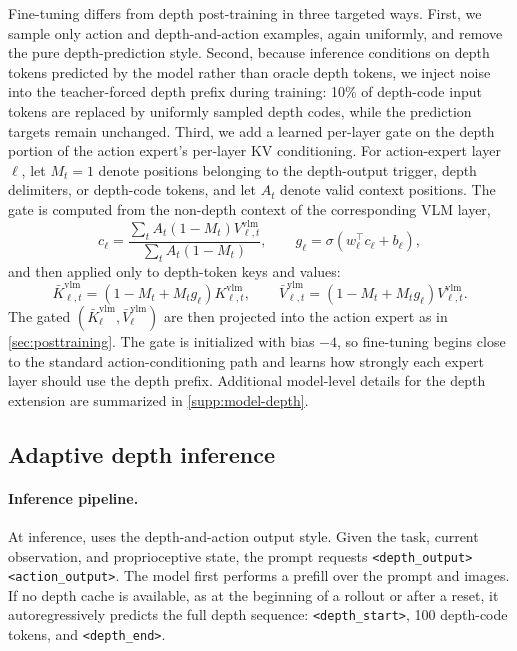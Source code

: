 Fine-tuning differs from depth post-training in three targeted ways. First, we
sample only action and depth-and-action examples, again uniformly, and remove
the pure depth-prediction style. Second, because inference conditions on depth
tokens predicted by the model rather than oracle depth tokens, we inject noise
into the teacher-forced depth prefix during training: 10\% of depth-code input
tokens are replaced by uniformly sampled depth codes, while the prediction
targets remain unchanged. Third, we add a learned per-layer gate on the depth
portion of the action expert's per-layer KV conditioning. For action-expert layer
\(\ell\), let \(M_t=1\) denote positions belonging to the depth-output trigger,
depth delimiters, or depth-code tokens, and let \(A_t\) denote valid context
positions. The gate is computed from the non-depth context of the corresponding
VLM layer,
\begin{equation}
    c_\ell
    =
    \frac{
        \sum_t A_t(1-M_t)V^{\mathrm{vlm}}_{\ell,t}
    }{
        \sum_t A_t(1-M_t)
    },
    \qquad
    g_\ell
    =
    \sigma(w_\ell^\top c_\ell + b_\ell),
\end{equation}
and then applied only to depth-token keys and values:
\begin{equation}
    \bar{K}^{\mathrm{vlm}}_{\ell,t}
    =
    \left(1-M_t+M_t g_\ell\right)K^{\mathrm{vlm}}_{\ell,t},
    \qquad
    \bar{V}^{\mathrm{vlm}}_{\ell,t}
    =
    \left(1-M_t+M_t g_\ell\right)V^{\mathrm{vlm}}_{\ell,t}.
\end{equation}
The gated \((\bar{K}^{\mathrm{vlm}}_{\ell},\bar{V}^{\mathrm{vlm}}_{\ell})\)
are then projected into the action expert as in \autoref{sec:posttraining}.
The gate is initialized with bias \(-4\), so fine-tuning begins close to the
standard action-conditioning path and learns how strongly each expert layer
should use the depth prefix. Additional model-level details for the depth
extension are summarized in \autoref{supp:model-depth}.

\subsection{Adaptive depth inference}
\label{sec:adaptive-depth-inference}

\paragraph{Inference pipeline.}
At inference, \molmothink uses the depth-and-action output style. Given the task,
current observation, and proprioceptive state, the prompt requests
\texttt{<depth\_output><action\_output>}. The model first performs a prefill
over the prompt and images. If no depth cache is available, as at the beginning
of a rollout or after a reset, it autoregressively predicts the full depth
sequence: \texttt{<depth\_start>}, 100 depth-code tokens, and
\texttt{<depth\_end>}.

